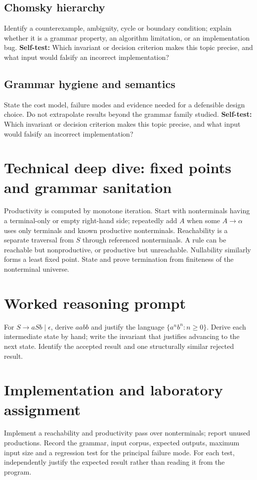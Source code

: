 \documentclass[11pt,letterpaper]{article}
\begin{document}
\subsection{Chomsky hierarchy}
Identify a counterexample, ambiguity, cycle or boundary condition; explain whether it is a grammar property, an algorithm limitation, or an implementation bug.
\textbf{Self-test:} Which invariant or decision criterion makes this topic precise, and what input would falsify an incorrect implementation?
\subsection{Grammar hygiene and semantics}
State the cost model, failure modes and evidence needed for a defensible design choice. Do not extrapolate results beyond the grammar family studied.
\textbf{Self-test:} Which invariant or decision criterion makes this topic precise, and what input would falsify an incorrect implementation?
\section{Technical deep dive: fixed points and grammar sanitation}
Productivity is computed by monotone iteration. Start with nonterminals having a terminal-only or empty right-hand side; repeatedly add $A$ when some $A\to\alpha$ uses only terminals and known productive nonterminals. Reachability is a separate traversal from $S$ through referenced nonterminals. A rule can be reachable but nonproductive, or productive but unreachable. Nullability similarly forms a least fixed point. State and prove termination from finiteness of the nonterminal universe.
\section{Worked reasoning prompt}
For $S\to aSb\mid\epsilon$, derive $aabb$ and justify the language $\{a^nb^n:n\geq0\}$. Derive each intermediate state by hand; write the invariant that justifies advancing to the next state. Identify the accepted result and one structurally similar rejected result.
\section{Implementation and laboratory assignment}
Implement a reachability and productivity pass over nonterminals; report unused productions. Record the grammar, input corpus, expected outputs, maximum input size and a regression test for the principal failure mode. For each test, independently justify the expected result rather than reading it from the program.
\end{document}
